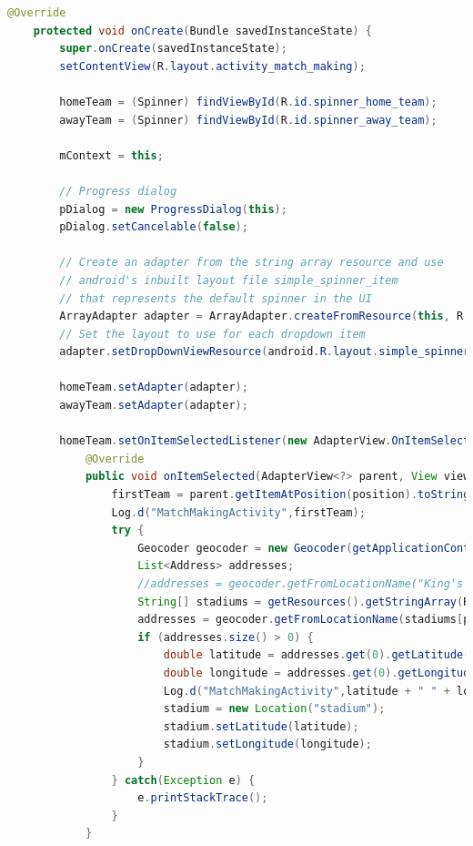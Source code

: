 \documentclass{article}
\begin{document}
\begin{landscape}
\begin{lstlisting}[language=Java,basicstyle=\tiny]
    @Override
    protected void onCreate(Bundle savedInstanceState) {
        super.onCreate(savedInstanceState);
        setContentView(R.layout.activity_match_making);

        homeTeam = (Spinner) findViewById(R.id.spinner_home_team);
        awayTeam = (Spinner) findViewById(R.id.spinner_away_team);

        mContext = this;

        // Progress dialog
        pDialog = new ProgressDialog(this);
        pDialog.setCancelable(false);

        // Create an adapter from the string array resource and use
        // android's inbuilt layout file simple_spinner_item
        // that represents the default spinner in the UI
        ArrayAdapter adapter = ArrayAdapter.createFromResource(this, R.array.premier_league, android.R.layout.simple_spinner_item);
        // Set the layout to use for each dropdown item
        adapter.setDropDownViewResource(android.R.layout.simple_spinner_dropdown_item);

        homeTeam.setAdapter(adapter);
        awayTeam.setAdapter(adapter);

        homeTeam.setOnItemSelectedListener(new AdapterView.OnItemSelectedListener() {
            @Override
            public void onItemSelected(AdapterView<?> parent, View view, int position, long id) {
                firstTeam = parent.getItemAtPosition(position).toString();
                Log.d("MatchMakingActivity",firstTeam);
                try {
                    Geocoder geocoder = new Geocoder(getApplicationContext());
                    List<Address> addresses;
                    //addresses = geocoder.getFromLocationName("King's Park Dr, Bournemouth BH7 7AF", 1);
                    String[] stadiums = getResources().getStringArray(R.array.premier_league_stadiums);
                    addresses = geocoder.getFromLocationName(stadiums[position], 1);
                    if (addresses.size() > 0) {
                        double latitude = addresses.get(0).getLatitude();
                        double longitude = addresses.get(0).getLongitude();
                        Log.d("MatchMakingActivity",latitude + " " + longitude);
                        stadium = new Location("stadium");
                        stadium.setLatitude(latitude);
                        stadium.setLongitude(longitude);
                    }
                } catch(Exception e) {
                    e.printStackTrace();
                }
            }


\end{lstlisting}
\end{landscape}
\end{document}
